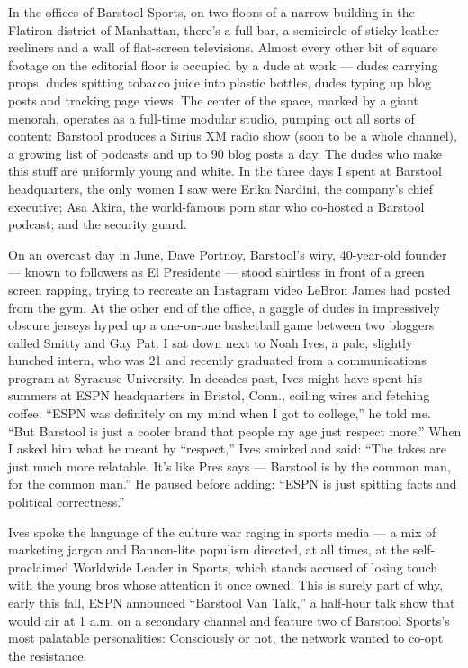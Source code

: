 In the offices of Barstool Sports, on two floors of a narrow building in
the Flatiron district of Manhattan, there's a full bar, a semicircle of
sticky leather recliners and a wall of flat-screen televisions. Almost
every other bit of square footage on the editorial floor is occupied by
a dude at work --- dudes carrying props, dudes spitting tobacco juice
into plastic bottles, dudes typing up blog posts and tracking page
views. The center of the space, marked by a giant menorah, operates as a
full-time modular studio, pumping out all sorts of content: Barstool
produces a Sirius XM radio show (soon to be a whole channel), a growing
list of podcasts and up to 90 blog posts a day. The dudes who make this
stuff are uniformly young and white. In the three days I spent at
Barstool headquarters, the only women I saw were Erika Nardini, the
company's chief executive; Asa Akira, the world-famous porn star who
co-hosted a Barstool podcast; and the security guard.

On an overcast day in June, Dave Portnoy, Barstool's wiry, 40-year-old
founder --- known to followers as El Presidente --- stood shirtless in
front of a green screen rapping, trying to recreate an Instagram video
LeBron James had posted from the gym. At the other end of the office, a
gaggle of dudes in impressively obscure jerseys hyped up a one-on-one
basketball game between two bloggers called Smitty and Gay Pat. I sat
down next to Noah Ives, a pale, slightly hunched intern, who was 21 and
recently graduated from a communications program at Syracuse University.
In decades past, Ives might have spent his summers at ESPN headquarters
in Bristol, Conn., coiling wires and fetching coffee. ``ESPN was
definitely on my mind when I got to college,'' he told me. ``But
Barstool is just a cooler brand that people my age just respect more.''
When I asked him what he meant by ``respect,'' Ives smirked and said:
``The takes are just much more relatable. It's like Pres says ---
Barstool is by the common man, for the common man.'' He paused before
adding: ``ESPN is just spitting facts and political correctness.''

Ives spoke the language of the culture war raging in sports media --- a
mix of marketing jargon and Bannon-lite populism directed, at all times,
at the self-proclaimed Worldwide Leader in Sports, which stands accused
of losing touch with the young bros whose attention it once owned. This
is surely part of why, early this fall, ESPN announced ``Barstool Van
Talk,'' a half-hour talk show that would air at 1 a.m. on a secondary
channel and feature two of Barstool Sports's most palatable
personalities: Consciously or not, the network wanted to co-opt the
resistance.

